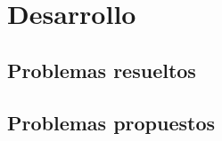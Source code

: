\documentclass{extbook}
\begin{document}

\tableofcontents
\listoffigures
\chapter{Desarrollo}
\section{Problemas resueltos}

\section{Problemas propuestos}

\end{document}

